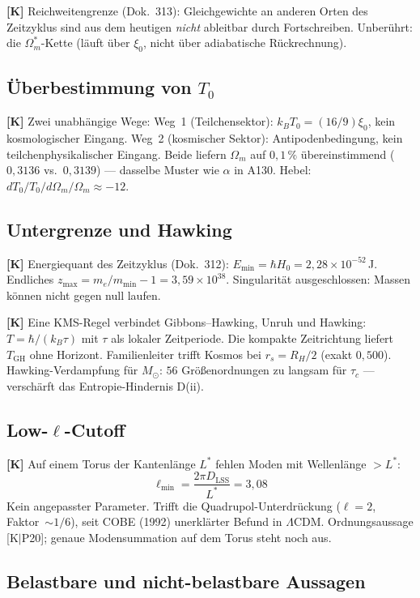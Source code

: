 \textbf{[K]} Reichweitengrenze (Dok.~313): Gleichgewichte an anderen
Orten des Zeitzyklus sind aus dem heutigen \emph{nicht} ableitbar
durch Fortschreiben. Unberührt: die $\Omega_m^*$-Kette (läuft über
$\xi_0$, nicht über adiabatische Rückrechnung).

\subsection{Überbestimmung von $T_0$}

\textbf{[K]} Zwei unabhängige Wege:
Weg~1 (Teilchensektor): $k_BT_0 = (16/9)\xi_0$, kein kosmologischer Eingang.
Weg~2 (kosmischer Sektor): Antipodenbedingung, kein teilchenphysikalischer Eingang.
Beide liefern $\Omega_m$ auf $0{,}1\,\%$ übereinstimmend
($0{,}3136$ vs.\ $0{,}3139$) --- dasselbe Muster wie $\alpha$ in A130.
Hebel: $dT_0/T_0 \big/ d\Omega_m/\Omega_m \approx -12$.

\subsection{Untergrenze und Hawking}

\textbf{[K]} Energiequant des Zeitzyklus (Dok.~312):
$E_\text{min} = \hbar H_0 = 2{,}28\times10^{-52}$\,J.
Endliches $z_\text{max} = m_e/m_\text{min} - 1 = 3{,}59\times10^{38}$.
Singularität ausgeschlossen: Massen können nicht gegen null laufen.

\textbf{[K]} Eine KMS-Regel verbindet Gibbons--Hawking, Unruh und
Hawking: $T = \hbar/(k_B\tau)$ mit $\tau$ als lokaler Zeitperiode.
Die kompakte Zeitrichtung liefert $T_\text{GH}$ ohne Horizont.
Familienleiter trifft Kosmos bei $r_s = R_H/2$ (exakt $0{,}500$).
Hawking-Verdampfung für $M_\odot$: $56$ Größenordnungen zu langsam
für $\tau_c$ --- verschärft das Entropie-Hindernis D(ii).

\subsection{Low-$\ell$-Cutoff}

\textbf{[K]} Auf einem Torus der Kantenlänge $L^*$ fehlen Moden mit
Wellenlänge $> L^*$:
\[
  \ell_\text{min} = \frac{2\pi D_\text{LSS}}{L^*} = 3{,}08
\]
Kein angepasster Parameter. Trifft die Quadrupol-Unterdrückung
($\ell = 2$, Faktor~$\sim 1/6$), seit COBE (1992) unerklärter Befund
in $\Lambda$CDM. Ordnungsaussage [K$|$P20]; genaue Modensummation
auf dem Torus steht noch aus.

\subsection{Belastbare und nicht-belastbare Aussagen}

